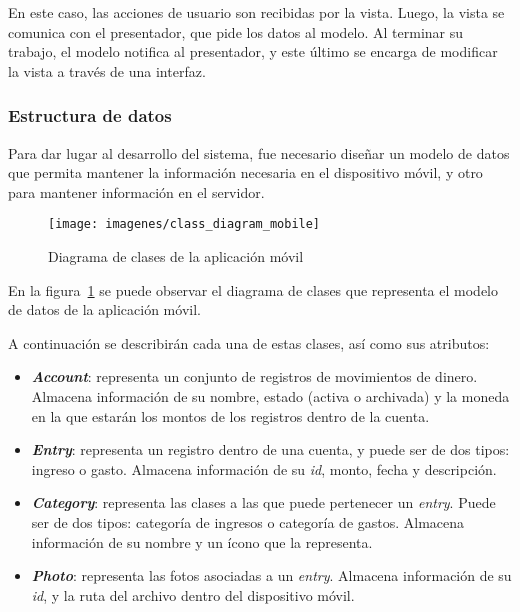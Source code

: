 En este caso, las acciones de usuario son recibidas por la vista. Luego, la vista se comunica con el presentador, que pide los datos al modelo. Al terminar su trabajo, el modelo notifica al presentador, y este último se encarga de modificar la vista a través de una interfaz.



\subsubsection{Estructura de datos}

Para dar lugar al desarrollo del sistema, fue necesario diseñar un modelo de datos que permita mantener la información necesaria en el dispositivo móvil, y otro para mantener información en el servidor.


\begin{figure}[ht]
  \centering
  \texttt{[image: imagenes/class\_diagram\_mobile]}
  \caption{Diagrama de clases de la aplicación móvil}
  \label{fig:diagramaClasesMovil}
\end{figure}

En la figura~\ref{fig:diagramaClasesMovil} se puede observar el diagrama de clases que representa el modelo de datos de la aplicación móvil. 


A continuación se describirán cada una de estas clases, así como sus atributos:

\begin{itemize}
	\item \textbf{\textit{Account}}: representa un conjunto de registros de movimientos de dinero. Almacena información de su nombre, estado (activa o archivada) y la moneda en la que estarán los montos de los registros dentro de la cuenta.
	\item \textbf{\textit{Entry}}: representa un registro dentro de una cuenta, y puede ser de dos tipos: ingreso o gasto. Almacena información de su \textit{id}, monto, fecha y descripción.
	\item \textbf{\textit{Category}}: representa las clases a las que puede pertenecer un \textit{entry}. Puede ser de dos tipos: categoría de ingresos o categoría de gastos. Almacena información de su nombre y un ícono que la representa.
	\item \textbf{\textit{Photo}}: representa las fotos asociadas a un \textit{entry}. Almacena información de su \textit{id}, y la ruta del archivo dentro del dispositivo móvil.
\end{itemize}

